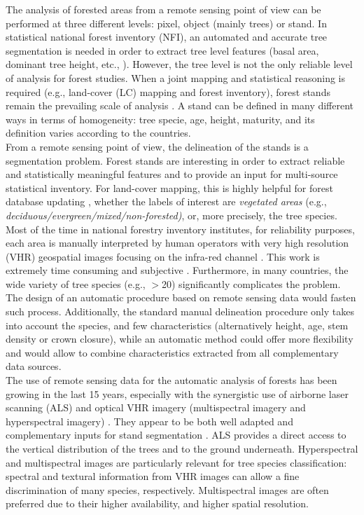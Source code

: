 The analysis of forested areas from a remote sensing point of view can be performed at three different levels: pixel, object (mainly trees) or stand. In statistical national forest inventory (NFI), an automated and accurate tree segmentation is needed in order to extract tree level features (basal area, dominant tree height, etc., \citep{means2000predicting,Malatamo}). However, the tree level is not the only reliable level of analysis for forest studies. When a joint mapping and statistical reasoning is required (e.g., land-cover (LC) mapping and forest inventory), forest stands remain the prevailing scale of analysis \citep{means2000predicting,White2016CJRS}. A stand can be defined in many different ways in terms of homogeneity: tree specie, age, height, maturity, and its definition varies according to the countries. \\

From a remote sensing point of view, the delineation of the stands is a segmentation problem. Forest stands are interesting in order to extract reliable and statistically meaningful features and to provide an input for multi-source statistical inventory. For land-cover mapping, this is highly helpful for forest database updating \citep{Kim09}, whether the labels of interest are \textit{vegetated areas} {(e.g., \textit{deciduous/evergreen/mixed/non-forested)}}, or, more precisely, the tree species. Most of the time in national forestry inventory institutes, for reliability purposes, each area is manually interpreted by human operators with very high resolution (VHR) geospatial images focusing on the infra-red channel \citep{Malatamo}. This work is extremely time consuming and subjective \citep{Wulder2008}. Furthermore, in many countries, the wide variety of tree species (e.g., $>$20) significantly complicates the problem. The design of an automatic procedure based on remote sensing data would fasten such process. Additionally, the standard manual delineation procedure only takes into account the species, and few characteristics (alternatively height, age, stem density or crown closure), while an automatic method could offer more flexibility and would allow to combine characteristics extracted from all complementary data sources. \\

The use of remote sensing data for the automatic analysis of forests has been growing in the last 15 years, especially with the synergistic use of airborne laser scanning (ALS) and optical VHR imagery (multispectral imagery and hyperspectral imagery) \citep{torabzadeh2014fusion,White2016CJRS}. They appear to be both well adapted and complementary inputs for stand segmentation \citep{dalponte2012tree,dalponte2015delineation,7500049}. ALS provides a direct access to the vertical distribution of the trees and to the ground underneath. Hyperspectral and multispectral images are particularly relevant for tree species classification: spectral and textural information from VHR  images can allow a fine discrimination of many species, respectively. Multispectral images are often preferred due to their higher availability, and higher spatial resolution. \\


